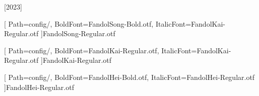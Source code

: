 [2023]


    


[
    Path=config/,
    BoldFont=FandolSong-Bold.otf,
    ItalicFont=FandolKai-Regular.otf
    ]{FandolSong-Regular.otf}

[
    Path=config/,
    BoldFont=FandolKai-Regular.otf,
    ItalicFont=FandolKai-Regular.otf
]{FandolKai-Regular.otf}

[
    Path=config/,
    BoldFont=FandolHei-Bold.otf,
    ItalicFont=FandolHei-Regular.otf
]{FandolHei-Regular.otf}



\newcommand\kaishu{\CJKfamily{kai}}
\newcommand\songti{\CJKfamily{song}}
\newcommand\heiti{\CJKfamily{hei}}

